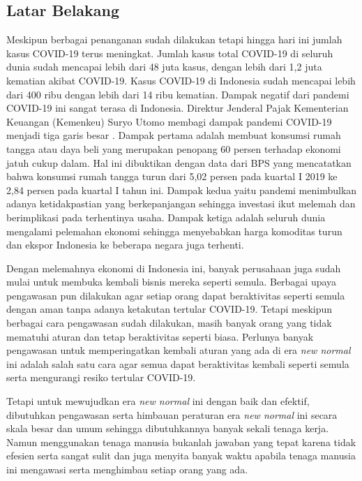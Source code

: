 \documentclass{article}
\begin{document}
  	\subsection{Latar Belakang}
	  	Meskipun berbagai penanganan sudah dilakukan tetapi hingga hari ini jumlah kasus COVID-19 terus meningkat. Jumlah kasus total COVID-19 di seluruh dunia sudah mencapai lebih dari 48 juta kasus, dengan lebih dari 1,2 juta kematian akibat COVID-19. Kasus COVID-19 di Indonesia sudah mencapai lebih dari 400 ribu dengan lebih dari 14 ribu kematian. Dampak negatif dari pandemi COVID-19 ini sangat terasa di Indonesia. Direktur Jenderal Pajak Kementerian Keuangan (Kemenkeu) Suryo Utomo membagi dampak pandemi COVID-19 menjadi tiga garis besar \cite{zuraya}. Dampak pertama adalah membuat konsumsi rumah tangga atau daya beli yang merupakan penopang 60 persen terhadap ekonomi jatuh cukup dalam. Hal ini dibuktikan dengan data dari BPS yang mencatatkan bahwa konsumsi rumah tangga turun dari 5,02 persen pada kuartal I 2019 ke 2,84 persen pada kuartal I tahun ini. Dampak kedua yaitu pandemi menimbulkan adanya ketidakpastian yang berkepanjangan sehingga investasi ikut melemah dan berimplikasi pada terhentinya usaha. Dampak ketiga adalah seluruh dunia mengalami pelemahan ekonomi sehingga menyebabkan harga komoditas turun dan ekspor Indonesia ke beberapa negara juga terhenti.
	  	
	  	\par Dengan melemahnya ekonomi di Indonesia ini, banyak perusahaan juga sudah mulai untuk membuka kembali bisnis mereka seperti semula. Berbagai upaya pengawasan pun dilakukan agar setiap orang dapat beraktivitas seperti semula dengan aman tanpa adanya ketakutan tertular COVID-19. Tetapi meskipun berbagai cara pengawasan sudah dilakukan, masih banyak orang yang tidak mematuhi aturan dan tetap beraktivitas seperti biasa. Perlunya banyak pengawasan untuk memperingatkan kembali aturan yang ada di era \textit{new normal} ini adalah salah satu cara agar semua dapat beraktivitas kembali seperti semula serta mengurangi resiko tertular COVID-19.
	  	
	  	\par Tetapi untuk mewujudkan era \textit{new normal} ini dengan baik dan efektif, dibutuhkan pengawasan serta himbauan peraturan era \textit{new normal} ini secara skala besar dan umum sehingga dibutuhkannya banyak sekali tenaga kerja. Namun menggunakan tenaga manusia bukanlah jawaban yang tepat karena tidak efesien serta sangat sulit dan juga menyita banyak waktu apabila tenaga manusia ini mengawasi serta menghimbau setiap orang yang ada.
\end{document}
